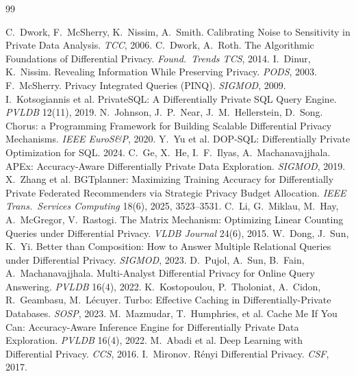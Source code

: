 \documentclass[sigconf,nonacm]{acmart}
\begin{document}
\begin{thebibliography}{99}\footnotesize

 C.\ Dwork, F.\ McSherry, K.\ Nissim, A.\ Smith. Calibrating Noise to Sensitivity in Private Data Analysis. \emph{TCC}, 2006.
 C.\ Dwork, A.\ Roth. The Algorithmic Foundations of Differential Privacy. \emph{Found.\ Trends TCS}, 2014.
 I.\ Dinur, K.\ Nissim. Revealing Information While Preserving Privacy. \emph{PODS}, 2003.
 F.\ McSherry. Privacy Integrated Queries (PINQ). \emph{SIGMOD}, 2009.
 I.\ Kotsogiannis et al. PrivateSQL: A Differentially Private SQL Query Engine. \emph{PVLDB} 12(11), 2019.
 N.\ Johnson, J.\ P.\ Near, J.\ M.\ Hellerstein, D.\ Song. Chorus: a Programming Framework for Building Scalable Differential Privacy Mechanisms. \emph{IEEE EuroS\&P}, 2020.
 Y.\ Yu et al. DOP-SQL: Differentially Private Optimization for SQL. 2024.
 C.\ Ge, X.\ He, I.\ F.\ Ilyas, A.\ Machanavajjhala. APEx: Accuracy-Aware Differentially Private Data Exploration. \emph{SIGMOD}, 2019.
 X.\ Zhang et al. BGTplanner: Maximizing Training Accuracy for Differentially Private Federated Recommenders via Strategic Privacy Budget Allocation. \emph{IEEE Trans.\ Services Computing} 18(6), 2025, 3523--3531.
 C.\ Li, G.\ Miklau, M.\ Hay, A.\ McGregor, V.\ Rastogi. The Matrix Mechanism: Optimizing Linear Counting Queries under Differential Privacy. \emph{VLDB Journal} 24(6), 2015.
 W.\ Dong, J.\ Sun, K.\ Yi. Better than Composition: How to Answer Multiple Relational Queries under Differential Privacy. \emph{SIGMOD}, 2023.
 D.\ Pujol, A.\ Sun, B.\ Fain, A.\ Machanavajjhala. Multi-Analyst Differential Privacy for Online Query Answering. \emph{PVLDB} 16(4), 2022.
 K.\ Kostopoulou, P.\ Tholoniat, A.\ Cidon, R.\ Geambasu, M.\ L\'ecuyer. Turbo: Effective Caching in Differentially-Private Databases. \emph{SOSP}, 2023.
 M.\ Mazmudar, T.\ Humphries, et al. Cache Me If You Can: Accuracy-Aware Inference Engine for Differentially Private Data Exploration. \emph{PVLDB} 16(4), 2022.
 M.\ Abadi et al. Deep Learning with Differential Privacy. \emph{CCS}, 2016.
 I.\ Mironov. R\'enyi Differential Privacy. \emph{CSF}, 2017.

\end{thebibliography}
\end{document}
